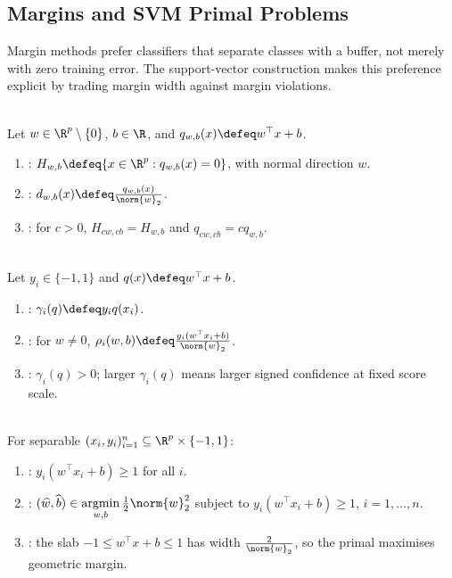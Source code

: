 \subsection{Margins and SVM Primal Problems}
Margin methods prefer classifiers that separate classes with a buffer, not merely with zero training error.  The support-vector construction makes this preference explicit by trading margin width against margin violations.

\begin{definition} \label{def:sl-affine-hyperplane-signed-distance} \\
Let $w\in\R^p\setminus\{0\}$, $b\in\R$, and $q_{w,b}(x)\defeq w^\top x+b$.
\begin{enumerate}[label=(\roman*)]
\setlength{\itemsep}{0pt}
\item {}: $H_{w,b}\defeq\{x\in\R^p:q_{w,b}(x)=0\}$, with normal direction $w$.
\item {}: $d_{w,b}(x)\defeq \frac{q_{w,b}(x)}{\norm{w}_2}$.
\item {}: for $c>0$, $H_{cw,cb}=H_{w,b}$ and $q_{cw,cb}=cq_{w,b}$.
\end{enumerate}
\end{definition}

\begin{definition} \label{def:sl-functional-margin} \\
Let $y_i\in\{-1,1\}$ and $q(x)\defeq w^\top x+b$.
\begin{enumerate}[label=(\roman*)]
\setlength{\itemsep}{0pt}
\item {}: $\gamma_i(q)\defeq y_iq(x_i)$.
\item {}: for $w\neq0$, $\rho_i(w,b)\defeq \frac{y_i(w^\top x_i+b)}{\norm{w}_2}$.
\item {}: $\gamma_i(q)>0$; larger $\gamma_i(q)$ means larger signed confidence at fixed score scale.
\end{enumerate}
\end{definition}

\begin{definition} \label{def:sl-hard-margin-svm} \\
For separable $(x_i,y_i)_{i=1}^n\subseteq\R^p\times\{-1,1\}$:
\begin{enumerate}[label=(\roman*)]
\setlength{\itemsep}{0pt}
\item {}: $y_i(w^\top x_i+b)\geq1$ for all $i$.
\item {}: $(\widehat{w},\widehat{b})\in\operatorname*{argmin}\limits_{w,b}\frac12\norm{w}_2^2$ subject to $y_i(w^\top x_i+b)\geq1$, $i=1,\ldots,n$.
\item {}: the slab $-1\leq w^\top x+b\leq1$ has width $\frac{2}{\norm{w}_2}$, so the primal maximises geometric margin.
\end{enumerate}
\end{definition}

